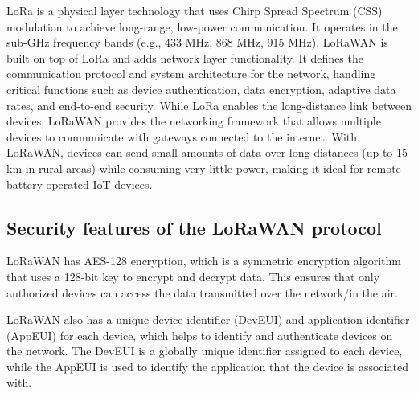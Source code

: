 LoRa is a physical layer technology that uses Chirp Spread Spectrum (CSS) modulation to achieve long-range, low-power communication. It operates in the sub-GHz frequency bands (e.g., 433 MHz, 868 MHz, 915 MHz). 
LoRaWAN is built on top of LoRa and adds network layer functionality. It defines the communication protocol and system architecture for the network, handling critical functions such as device authentication, data encryption, adaptive data rates, and end-to-end security\cite{lora_alliance}.
While LoRa enables the long-distance link between devices, LoRaWAN provides the networking framework that allows multiple devices to communicate with gateways connected to the internet.
With LoRaWAN, devices can send small amounts of data over long distances (up to 15 km in rural areas) while consuming very little power, making it ideal for remote battery-operated IoT devices.

\subsection{Security features of the LoRaWAN protocol}


LoRaWAN has AES-128 encryption, which is a symmetric encryption algorithm that uses a 128-bit key to encrypt and decrypt data. This ensures that only authorized devices can access the data transmitted over the network/in the air.

LoRaWAN also has a unique device identifier (DevEUI) and application identifier (AppEUI) for each device, which helps to identify and authenticate devices on the network. The DevEUI is a globally unique identifier assigned to each device, while the AppEUI is used to identify the application that the device is associated with.
